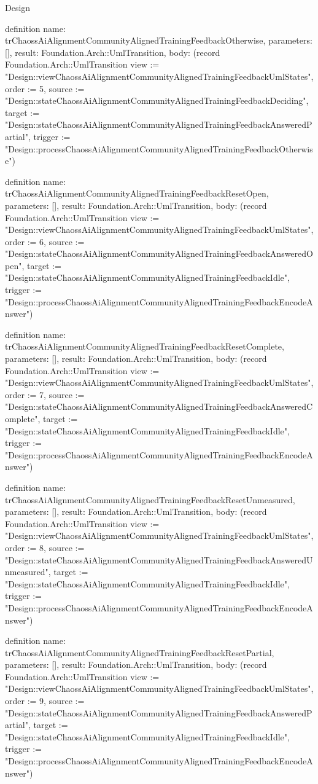 \begin{lexlean}{Design}
\begin{semanticmodule}
definition{
  name: trChaossAiAlignmentCommunityAlignedTrainingFeedbackOtherwise,
  parameters: [],
  result: Foundation.Arch::UmlTransition,
  body: (record Foundation.Arch::UmlTransition {view := "Design::viewChaossAiAlignmentCommunityAlignedTrainingFeedbackUmlStates", order := 5, source := "Design::stateChaossAiAlignmentCommunityAlignedTrainingFeedbackDeciding", target := "Design::stateChaossAiAlignmentCommunityAlignedTrainingFeedbackAnsweredPartial", trigger := "Design::processChaossAiAlignmentCommunityAlignedTrainingFeedbackOtherwise"})
}

definition{
  name: trChaossAiAlignmentCommunityAlignedTrainingFeedbackResetOpen,
  parameters: [],
  result: Foundation.Arch::UmlTransition,
  body: (record Foundation.Arch::UmlTransition {view := "Design::viewChaossAiAlignmentCommunityAlignedTrainingFeedbackUmlStates", order := 6, source := "Design::stateChaossAiAlignmentCommunityAlignedTrainingFeedbackAnsweredOpen", target := "Design::stateChaossAiAlignmentCommunityAlignedTrainingFeedbackIdle", trigger := "Design::processChaossAiAlignmentCommunityAlignedTrainingFeedbackEncodeAnswer"})
}

definition{
  name: trChaossAiAlignmentCommunityAlignedTrainingFeedbackResetComplete,
  parameters: [],
  result: Foundation.Arch::UmlTransition,
  body: (record Foundation.Arch::UmlTransition {view := "Design::viewChaossAiAlignmentCommunityAlignedTrainingFeedbackUmlStates", order := 7, source := "Design::stateChaossAiAlignmentCommunityAlignedTrainingFeedbackAnsweredComplete", target := "Design::stateChaossAiAlignmentCommunityAlignedTrainingFeedbackIdle", trigger := "Design::processChaossAiAlignmentCommunityAlignedTrainingFeedbackEncodeAnswer"})
}

definition{
  name: trChaossAiAlignmentCommunityAlignedTrainingFeedbackResetUnmeasured,
  parameters: [],
  result: Foundation.Arch::UmlTransition,
  body: (record Foundation.Arch::UmlTransition {view := "Design::viewChaossAiAlignmentCommunityAlignedTrainingFeedbackUmlStates", order := 8, source := "Design::stateChaossAiAlignmentCommunityAlignedTrainingFeedbackAnsweredUnmeasured", target := "Design::stateChaossAiAlignmentCommunityAlignedTrainingFeedbackIdle", trigger := "Design::processChaossAiAlignmentCommunityAlignedTrainingFeedbackEncodeAnswer"})
}

definition{
  name: trChaossAiAlignmentCommunityAlignedTrainingFeedbackResetPartial,
  parameters: [],
  result: Foundation.Arch::UmlTransition,
  body: (record Foundation.Arch::UmlTransition {view := "Design::viewChaossAiAlignmentCommunityAlignedTrainingFeedbackUmlStates", order := 9, source := "Design::stateChaossAiAlignmentCommunityAlignedTrainingFeedbackAnsweredPartial", target := "Design::stateChaossAiAlignmentCommunityAlignedTrainingFeedbackIdle", trigger := "Design::processChaossAiAlignmentCommunityAlignedTrainingFeedbackEncodeAnswer"})
}


\end{semanticmodule}
\end{lexlean}
